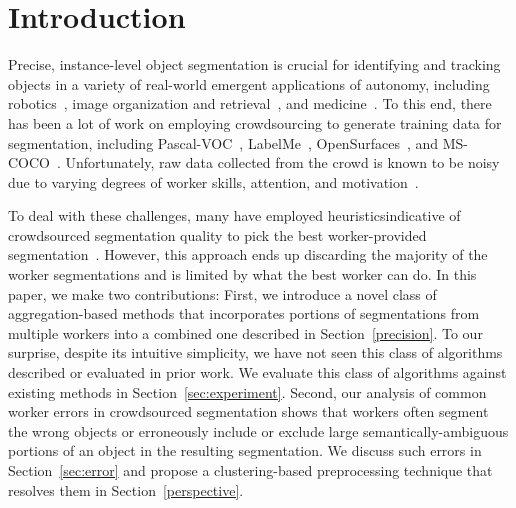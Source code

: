 \documentclass[letterpaper]{article}
\begin{document}
\section{Introduction\label{sec:intro}}
Precise, instance-level object segmentation is crucial for identifying and tracking objects in a variety of real-world emergent applications of autonomy, including robotics~\cite{Natonek1998}, image organization and retrieval~\cite{Yamaguchi2012}, and medicine~\cite{Irshad2014}. To this end, there has been a lot of work on employing crowdsourcing to generate training data for segmentation, including Pascal-VOC~\cite{Everingham15}, LabelMe~\cite{Torralba2010}, OpenSurfaces~\cite{bell15minc}, and MS-COCO~\cite{Lin2012}. Unfortunately, raw data collected from the crowd is known to be noisy due to varying degrees of worker skills, attention, and motivation~\cite{bell14intrinsic,MDWWelinder2010}. 
\par To deal with these challenges, many have employed heuristicsindicative of crowdsourced segmentation quality to pick the best worker-provided segmentation~\cite{Sorokin2008,Vittayakorn2011}. However, this approach ends up discarding the majority of the worker segmentations and is limited by what the best worker can do. In this paper, we make two contributions: First, we introduce a novel class of aggregation-based methods that incorporates portions of segmentations from multiple workers into a combined one described in Section~\ref{precision}. To our surprise, despite its intuitive simplicity, we have not seen this class of algorithms described or evaluated in prior work. We evaluate this class of algorithms against existing methods in Section~\ref{sec:experiment}. Second, our analysis of common worker errors in crowdsourced segmentation shows that workers often segment the wrong objects or erroneously include or exclude large semantically-ambiguous portions of an object in the resulting segmentation. We discuss such errors in Section~\ref{sec:error} and propose a clustering-based preprocessing technique that resolves them in Section~\ref{perspective}.%


\end{document}
